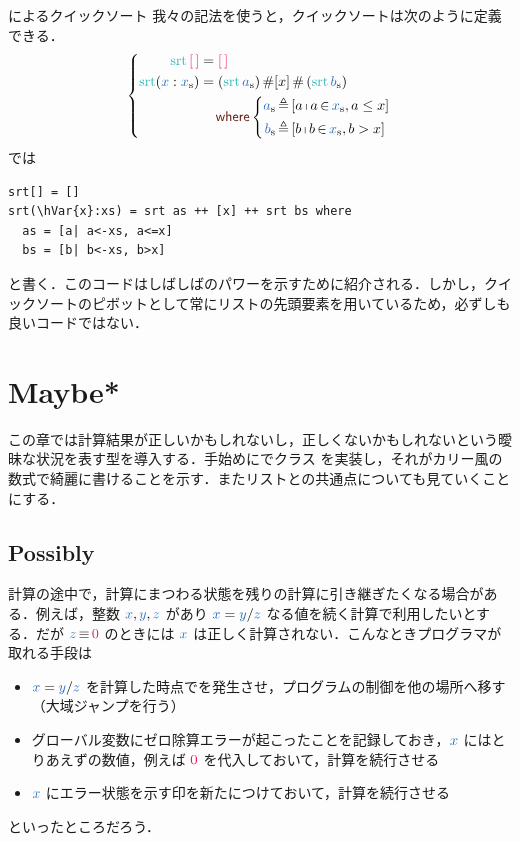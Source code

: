 \documentclass[a5paper,twoside,fleqn,draft]{jsbook}
\begin{document}
\begin{note}{\haskell によるクイックソート}
我々の記法を使うと，クイックソートは次のように定義できる．
\begin{equation*}
  \left\{
  \begin{aligned}
    \mSort\mEmptyList
    &=\mEmptyList\\
    \mSort(\hVar{x}:\hListVar{x})
    &=(\mSort\hListVar{a})\hAppend[x]\hAppend{}(\mSort\hListVar{b})\\
    &\quad\mWhere\left\{\begin{aligned}
    \hListVar{a}&\mLetEq{}[a\mListComp a\mFrom\hListVar{x},a\le x]\\
    \hListVar{b}&\mLetEq{}[b\mListComp b\mFrom\hListVar{x},b>x]
    \end{aligned}
    \right.
  \end{aligned}
  \right.
\end{equation*}
\haskell では %
\begin{haskellcode}
\begin{verbatim}
srt[] = []
srt(\hVar{x}:xs) = srt as ++ [x] ++ srt bs where
  as = [a| a<-xs, a<=x]
  bs = [b| b<-xs, b>x]
\end{verbatim}
\end{haskellcode}
と書く．このコードはしばしば\haskell のパワーを示すために紹介される．しかし，クイックソートのピボットとして常にリストの先頭要素を用いているため，必ずしも良いコードではない．
\end{note}

\chapter{Maybe*}
\label{ch:maybe}

\begin{leader}
この章では計算結果が正しいかもしれないし，正しくないかもしれないという曖昧な状況を表す型を導入する．手始めに\python でクラス  を実装し，それがカリー風の数式で綺麗に書けることを示す．またリストとの共通点についても見ていくことにする．
\end{leader}

\section{Possibly}

計算の途中で，計算にまつわる状態を残りの計算に引き継ぎたくなる場合がある．例えば，整数 $\hVar{x},\hVar{y},\hVar{z}$ があり $\hVar{x}=\hVar{y}/\hVar{z}$ なる値を続く計算で利用したいとする．だが $\hVar{z}\hIfEq\hConstant{0}$ のときには $\hVar{x}$ は正しく計算されない．こんなときプログラマが取れる手段は
\begin{itemize}
\item $\hVar{x}=\hVar{y}/\hVar{z}$ を計算した時点でを発生させ，プログラムの制御を他の場所へ移す（大域ジャンプを行う）
\item グローバル変数にゼロ除算エラーが起こったことを記録しておき，$\hVar{x}$ にはとりあえずの数値，例えば $\hConstant{0}$ を代入しておいて，計算を続行させる
\item $\hVar{x}$ にエラー状態を示す印を新たにつけておいて，計算を続行させる
\end{itemize}
といったところだろう．
\end{document}

